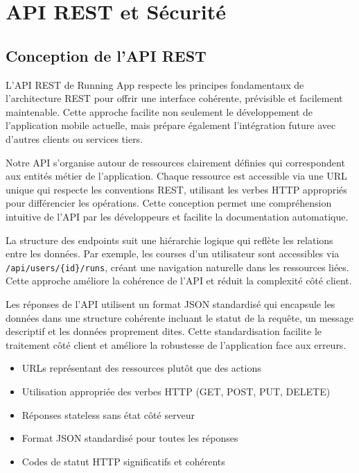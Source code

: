 \section{API REST et Sécurité}

\subsection{Conception de l'API REST}

L'API REST de Running App respecte les principes fondamentaux de l'architecture REST pour offrir une interface cohérente, prévisible et facilement maintenable. Cette approche facilite non seulement le développement de l'application mobile actuelle, mais prépare également l'intégration future avec d'autres clients ou services tiers.

Notre API s'organise autour de ressources clairement définies qui correspondent aux entités métier de l'application. Chaque ressource est accessible via une URL unique qui respecte les conventions REST, utilisant les verbes HTTP appropriés pour différencier les opérations. Cette conception permet une compréhension intuitive de l'API par les développeurs et facilite la documentation automatique.

La structure des endpoints suit une hiérarchie logique qui reflète les relations entre les données. Par exemple, les courses d'un utilisateur sont accessibles via \texttt{/api/users/\{id\}/runs}, créant une navigation naturelle dans les ressources liées. Cette approche améliore la cohérence de l'API et réduit la complexité côté client.

Les réponses de l'API utilisent un format JSON standardisé qui encapsule les données dans une structure cohérente incluant le statut de la requête, un message descriptif et les données proprement dites. Cette standardisation facilite le traitement côté client et améliore la robustesse de l'application face aux erreurs.

\begin{infobox}
\begin{itemize}[leftmargin=1cm]
\item URLs représentant des ressources plutôt que des actions
\item Utilisation appropriée des verbes HTTP (GET, POST, PUT, DELETE)
\item Réponses stateless sans état côté serveur
\item Format JSON standardisé pour toutes les réponses
\item Codes de statut HTTP significatifs et cohérents
\end{itemize}
\end{infobox}

